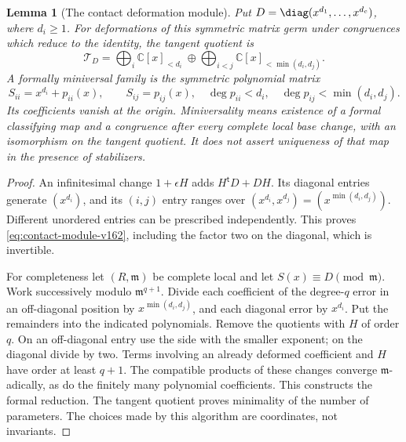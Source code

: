 \documentclass[11pt,reqno]{amsart}
\numberwithin{equation}{section}
\newtheorem{lemma}[theorem]{Lemma}
\theoremstyle{definition}\newtheorem{definition}[theorem]{Definition}
\theoremstyle{remark}\newtheorem{remark}[theorem]{Remark}
\newcommand{\C}{\mathbb C}\newcommand{\Q}{\mathbb Q}
\begin{document}
\begin{lemma}[The contact deformation module]
\label{lem:contact-module-v162}
Put $D=\diag(x^{d_1},\ldots,x^{d_c})$, where $d_i\geq1$.
For deformations of this symmetric matrix germ under congruences
which reduce to the identity, the tangent quotient is
\begin{equation}\label{eq:contact-module-v162}
 \mathcal T_D=
 \bigoplus_i\C[x]_{<d_i}\ \oplus\!
 \bigoplus_{i<j}\C[x]_{<\min(d_i,d_j)}.
\end{equation}
A formally miniversal family is the symmetric polynomial matrix
\begin{equation}\label{eq:versal-matrix-v162}
 S_{ii}=x^{d_i}+p_{ii}(x),\qquad
 S_{ij}=p_{ij}(x),\quad
 \deg p_{ii}<d_i,\quad\deg p_{ij}<\min(d_i,d_j).
\end{equation}
Its coefficients vanish at the origin. Miniversality means existence
of a formal classifying map and a congruence after every complete
local base change, with an isomorphism on the tangent quotient. It
does not assert uniqueness of that map in the presence of stabilizers.
\end{lemma}
\begin{proof}
An infinitesimal change $1+\epsilon H$ adds $H^{\mathsf t}D+DH$.
Its diagonal entries generate $(x^{d_i})$, and its $(i,j)$ entry
ranges over $(x^{d_i},x^{d_j})=(x^{\min(d_i,d_j)})$.
Different unordered entries can be prescribed independently. This
proves \eqref{eq:contact-module-v162}, including the factor two on
the diagonal, which is invertible.

For completeness let $(R,\mathfrak m)$ be complete local and let
$S(x)\equiv D\pmod{\mathfrak m}$. Work successively modulo
$\mathfrak m^{q+1}$. Divide each coefficient of the degree-$q$
error in an off-diagonal position by $x^{\min(d_i,d_j)}$, and each
diagonal error by $x^{d_i}$. Put the remainders into the indicated
polynomials. Remove the quotients with $H$ of order $q$. On an
off-diagonal entry use the side with the smaller exponent; on the
diagonal divide by two. Terms involving an already deformed
coefficient and $H$ have order at least $q+1$. The compatible products
of these changes converge $\mathfrak m$-adically, as do the finitely
many polynomial coefficients. This constructs the formal reduction.
The tangent quotient proves minimality of the number of parameters.
The choices made by this algorithm are coordinates, not invariants.
\end{proof}
\end{document}
